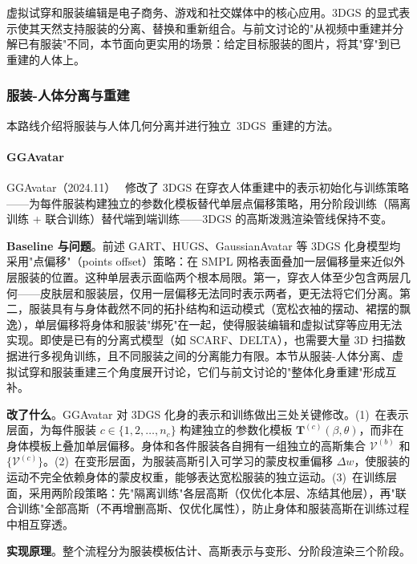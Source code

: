 虚拟试穿和服装编辑是电子商务、游戏和社交媒体中的核心应用。3DGS 的显式表示使其天然支持服装的分离、替换和重新组合。与前文讨论的"从视频中重建并分解已有服装"不同，本节面向更实用的场景：给定目标服装的图片，将其"穿"到已重建的人体上。

\subsubsection{服装-人体分离与重建}

本路线介绍将服装与人体几何分离并进行独立~3DGS~重建的方法。

\paragraph{GGAvatar}

GGAvatar（2024.11）~\cite{2411_09952} 修改了 3DGS 在穿衣人体重建中的表示初始化与训练策略——为每件服装构建独立的参数化模板替代单层点偏移策略，用分阶段训练（隔离训练 + 联合训练）替代端到端训练——3DGS 的高斯泼溅渲染管线保持不变。

\textbf{Baseline 与问题}。前述 GART、HUGS、GaussianAvatar 等 3DGS 化身模型均采用"点偏移"（points offset）策略：在 SMPL 网格表面叠加一层偏移量来近似外层服装的位置。这种单层表示面临两个根本局限。第一，穿衣人体至少包含两层几何——皮肤层和服装层，仅用一层偏移无法同时表示两者，更无法将它们分离。第二，服装具有与身体截然不同的拓扑结构和运动模式（宽松衣袖的摆动、裙摆的飘逸），单层偏移将身体和服装"绑死"在一起，使得服装编辑和虚拟试穿等应用无法实现。即使是已有的分离式模型（如 SCARF、DELTA），也需要大量 3D 扫描数据进行多视角训练，且不同服装之间的分离能力有限。本节从服装-人体分离、虚拟试穿和服装重建三个角度展开讨论，它们与前文讨论的"整体化身重建"形成互补。

\textbf{改了什么}。GGAvatar 对 3DGS 化身的表示和训练做出三处关键修改。(1)~在表示层面，为每件服装 $c \in \{1, 2, \ldots, n_c\}$ 构建独立的参数化模板 $\mathbf{T}^{(c)}(\beta, \theta)$，而非在身体模板上叠加单层偏移。身体和各件服装各自拥有一组独立的高斯集合 $\mathcal{V}^{(b)}$ 和 $\{\mathcal{V}^{(c)}\}$。(2)~在变形层面，为服装高斯引入可学习的蒙皮权重偏移 $\Delta w$，使服装的运动不完全依赖身体的蒙皮权重，能够表达宽松服装的独立运动。(3)~在训练层面，采用两阶段策略：先"隔离训练"各层高斯（仅优化本层、冻结其他层），再"联合训练"全部高斯（不再增删高斯、仅优化属性），防止身体和服装高斯在训练过程中相互穿透。

\textbf{实现原理}。整个流程分为服装模板估计、高斯表示与变形、分阶段渲染三个阶段。

